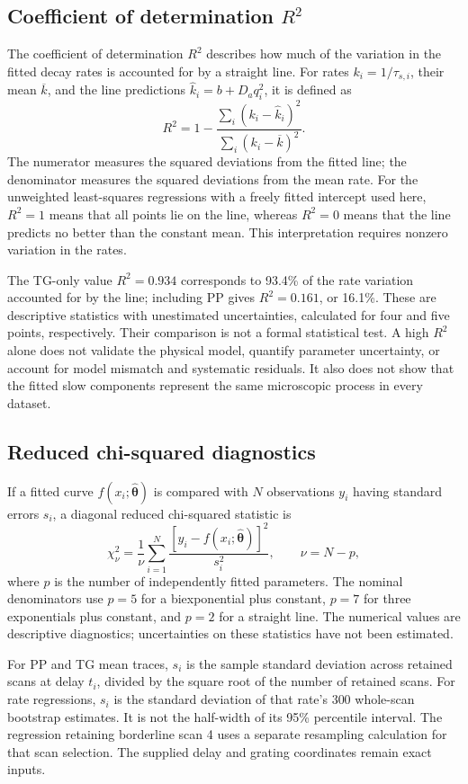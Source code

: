 \subsection{Coefficient of determination \texorpdfstring{$R^2$}{R-squared}}\label{app:r-squared}
The coefficient of determination $R^2$ describes how much of the variation in the fitted decay rates is accounted for by a straight line. For rates $k_i=1/\tau_{s,i}$, their mean $\overline{k}$, and the line predictions $\widehat{k}_i=b+D_aq_i^2$, it is defined as
\[
R^2=1-\frac{\sum_i(k_i-\widehat{k}_i)^2}
{\sum_i(k_i-\overline{k})^2}.
\]
The numerator measures the squared deviations from the fitted line; the denominator measures the squared deviations from the mean rate. For the unweighted least-squares regressions with a freely fitted intercept used here, $R^2=1$ means that all points lie on the line, whereas $R^2=0$ means that the line predicts no better than the constant mean. This interpretation requires nonzero variation in the rates.

The TG-only value $R^2=0.934$ corresponds to 93.4\% of the rate variation accounted for by the line; including PP gives $R^2=0.161$, or 16.1\%. These are descriptive statistics with unestimated uncertainties, calculated for four and five points, respectively. Their comparison is not a formal statistical test. A high $R^2$ alone does not validate the physical model, quantify parameter uncertainty, or account for model mismatch and systematic residuals. It also does not show that the fitted slow components represent the same microscopic process in every dataset.

\subsection{Reduced chi-squared diagnostics}\label{app:chi-squared}
If a fitted curve $f(x_i;\widehat{\boldsymbol\theta})$ is compared with $N$ observations $y_i$ having standard errors $s_i$, a diagonal reduced chi-squared statistic is
\[
\chi^2_\nu=\frac{1}{\nu}\sum_{i=1}^{N}
\frac{[y_i-f(x_i;\widehat{\boldsymbol\theta})]^2}{s_i^2},
\qquad \nu=N-p,
\]
where $p$ is the number of independently fitted parameters. The nominal denominators use $p=5$ for a biexponential plus constant, $p=7$ for three exponentials plus constant, and $p=2$ for a straight line. The numerical values are descriptive diagnostics; uncertainties on these statistics have not been estimated.

For PP and TG mean traces, $s_i$ is the sample standard deviation across retained scans at delay $t_i$, divided by the square root of the number of retained scans. For rate regressions, $s_i$ is the standard deviation of that rate's 300 whole-scan bootstrap estimates. It is not the half-width of its 95\% percentile interval. The regression retaining borderline scan 4 uses a separate resampling calculation for that scan selection. The supplied delay and grating coordinates remain exact inputs.

